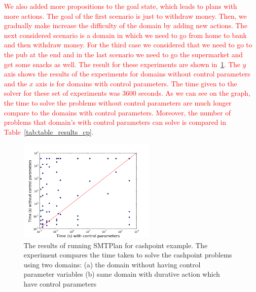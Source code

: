 \textcolor{red}{We also added more propositions to the goal state, which leads to plans with more actions. The goal of the first scenario is just to withdraw money. Then, we gradually make increase the difficulty of the domain by adding new actions. The next considered scenario is a domain in which we need to go from home to bank and then withdraw money. For the third case we considered that we need to go to the pub at the end and in the last scenario we need to go the supermarket and get some snacks as well.
The result for these experiments are shown in~\ref{fig:CP_results}. The $y$ axis shows the results of the experiments for domains without control parameters and the $x$ axis is for domains with control parameters. The time given to the solver for these set of experiments was 3600 seconds. As we can see on the graph, the time to solve the problems without control parameters are much longer compare to the domains with control parameters.
Moreover, the number of problems that domain's with control parameters can solve is compared in Table~\ref{tab:table_results_cp}.}

\begin{figure}[!ht]
\centering
\includegraphics[width=0.60\textwidth]{diagrams/CP_results.png}
\caption{The results of running SMTPlan for cashpoint example. The experiment compares the time taken to solve the cashpoint problems using two domains: (a) the domain without having control parameter variables (b) same domain with durative action which have control parameters}
\label{fig:CP_results}
\end{figure}

